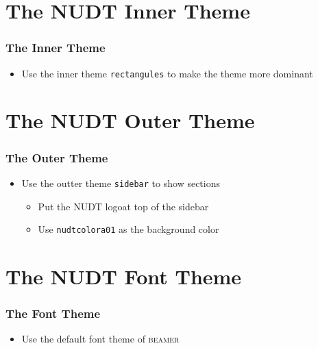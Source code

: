 \documentclass{beamer}
\begin{document}
\section[Inner Theme]{The NUDT Inner Theme}

\begin{frame}
  \frametitle{The Inner Theme}
  \begin{itemize}
  \item Use the inner theme \texttt{rectangules} to make the theme more dominant
  \end{itemize}
\end{frame}

\section[Outer Theme]{The NUDT Outer Theme}

\begin{frame}
  \frametitle{The Outer Theme}
  \begin{itemize}
  \item Use the outter theme \texttt{sidebar} to show sections
    \begin{itemize}
    \item Put the NUDT logoat top of the sidebar
    \item Use \texttt{\color{nudtcolora01}nudtcolora01} as the background color
    \end{itemize}
  \end{itemize}
\end{frame}

\section[Font Theme]{The NUDT Font Theme}

\begin{frame}
  \frametitle{The Font Theme}
  \begin{itemize}
  \item Use the default font theme of \textsc{beamer}
  \end{itemize}
\end{frame}
\end{document}
